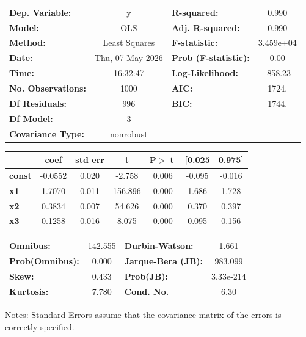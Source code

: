 \begin{center}
\begin{tabular}{lclc}
\toprule
\textbf{Dep. Variable:}    &        y         & \textbf{  R-squared:         } &     0.990   \\
\textbf{Model:}            &       OLS        & \textbf{  Adj. R-squared:    } &     0.990   \\
\textbf{Method:}           &  Least Squares   & \textbf{  F-statistic:       } & 3.459e+04   \\
\textbf{Date:}             & Thu, 07 May 2026 & \textbf{  Prob (F-statistic):} &     0.00    \\
\textbf{Time:}             &     16:32:47     & \textbf{  Log-Likelihood:    } &   -858.23   \\
\textbf{No. Observations:} &        1000      & \textbf{  AIC:               } &     1724.   \\
\textbf{Df Residuals:}     &         996      & \textbf{  BIC:               } &     1744.   \\
\textbf{Df Model:}         &           3      & \textbf{                     } &             \\
\textbf{Covariance Type:}  &    nonrobust     & \textbf{                     } &             \\
\bottomrule
\end{tabular}
\begin{tabular}{lcccccc}
               & \textbf{coef} & \textbf{std err} & \textbf{t} & \textbf{P$> |$t$|$} & \textbf{[0.025} & \textbf{0.975]}  \\
\midrule
\textbf{const} &      -0.0552  &        0.020     &    -2.758  &         0.006        &       -0.095    &       -0.016     \\
\textbf{x1}    &       1.7070  &        0.011     &   156.896  &         0.000        &        1.686    &        1.728     \\
\textbf{x2}    &       0.3834  &        0.007     &    54.626  &         0.000        &        0.370    &        0.397     \\
\textbf{x3}    &       0.1258  &        0.016     &     8.075  &         0.000        &        0.095    &        0.156     \\
\bottomrule
\end{tabular}
\begin{tabular}{lclc}
\textbf{Omnibus:}       & 142.555 & \textbf{  Durbin-Watson:     } &     1.661  \\
\textbf{Prob(Omnibus):} &   0.000 & \textbf{  Jarque-Bera (JB):  } &   983.099  \\
\textbf{Skew:}          &   0.433 & \textbf{  Prob(JB):          } & 3.33e-214  \\
\textbf{Kurtosis:}      &   7.780 & \textbf{  Cond. No.          } &      6.30  \\
\bottomrule
\end{tabular}
\end{center}

Notes: \newline
 [1] Standard Errors assume that the covariance matrix of the errors is correctly specified.